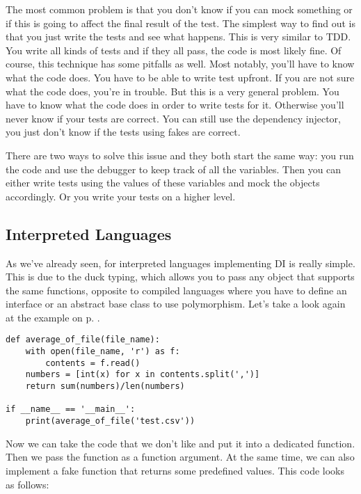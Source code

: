 The most common problem is that you don't know if you can mock something or if this is going to affect the final result of the test. The simplest way to find out is that you just write the tests and see what happens. This is very similar to TDD. You write all kinds of tests and if they all pass, the code is most likely fine. Of course, this technique has some pitfalls as well. Most notably, you'll have to know what the code does. You have to be able to write test upfront. If you are not sure what the code does, you're in trouble. But this is a very general problem. You have to know what the code does in order to write tests for it. Otherwise you'll never know if your tests are correct. You can still use the dependency injector, you just don't know if the tests using fakes are correct.

There are two ways to solve this issue and they both start the same way: you run the code and use the debugger to keep track of all the variables. Then you can either write tests using the values of these variables and mock the objects accordingly. Or you write your tests on a higher level.


\subsection{Interpreted Languages}

As we've already seen, for interpreted languages implementing DI is really simple. This is due to the duck typing, which allows you to pass any object that supports the same functions, opposite to compiled languages where you have to define an interface or an abstract base class to use polymorphism. Let's take a look again at the example on p. \pageref{prog:average_of_file}.

\begin{programcode}{}
\begin{verbatim}
def average_of_file(file_name):
    with open(file_name, 'r') as f:
        contents = f.read()
    numbers = [int(x) for x in contents.split(',')]
    return sum(numbers)/len(numbers)

if __name__ == '__main__':
    print(average_of_file('test.csv'))
\end{verbatim}
\end{programcode}

Now we can take the code that we don't like and put it into a dedicated function. Then we pass the function as a function argument. At the same time, we can also implement a fake function that returns some predefined values. This code looks as follows:

